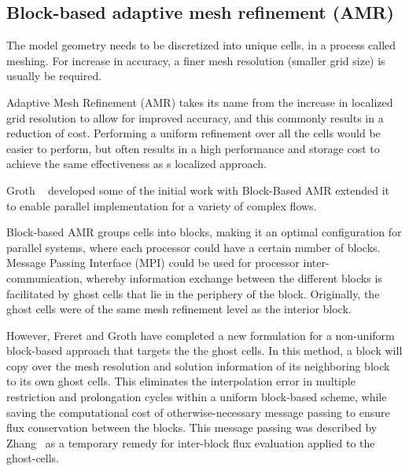 \subsection{Block-based adaptive mesh refinement (AMR)}
The model geometry needs to be discretized into unique cells, in a process called meshing. For increase in accuracy, a finer mesh resolution (smaller grid size) is usually be required. \par

Adaptive Mesh Refinement (AMR) takes its name from the increase in localized grid resolution to allow for improved accuracy, and this commonly results in a reduction of cost. Performing a uniform refinement over all the cells would be easier to perform, but often results in a high performance and storage cost to achieve the same effectiveness as s localized approach.\par

Groth \etal ~\cite{Groth:1999, Williamschen:2013, Northrup:2005b, Groth:2013, zhang:2011a, zhang:2011b} developed some of the initial work with Block-Based AMR extended it to enable parallel implementation for a variety of complex flows.

Block-based AMR groups cells into blocks, making it an optimal configuration for parallel systems, where each processor could have a certain number of blocks. Message Passing Interface (MPI) could be used for processor inter-communication, whereby  information exchange between the different blocks is facilitated by ghost cells that lie in the periphery of the block. Originally, the ghost cells were of the same mesh refinement level as the interior block.

However, Freret and Groth \cite{Freret:2015} have completed a new formulation for a non-uniform block-based approach that targets the the ghost cells. In this method, a block will copy over the mesh resolution and solution information of its neighboring block to its own ghost cells. This eliminates the interpolation error in multiple restriction and prolongation cycles within a uniform block-based scheme, while saving the computational cost of otherwise-necessary message passing to ensure flux conservation between the blocks. This message passing was described by Zhang~\cite{zhang:2011b} as a temporary remedy for inter-block flux evaluation applied to the ghost-cells.\par


